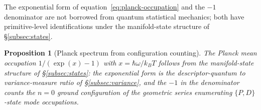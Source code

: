 \documentclass[11pt,a4paper]{article}
\newtheorem{proposition}[theorem]{Proposition}
\theoremstyle{definition}
\theoremstyle{remark}
\begin{document}
The exponential form of equation~\eqref{eq:planck-occupation} and the $-1$ denominator are not borrowed from quantum statistical mechanics; both have primitive-level identifications under the manifold-state structure of \S\ref{subsec:states}.

\begin{proposition}[Planck spectrum from configuration counting]\label{prop:planck-derived}
The Planck mean occupation $1/(\exp(x)-1)$ with $x = \hbar\omega/k_{B}T$ follows from the manifold-state structure of \S\ref{subsec:states}: the exponential form is the descriptor-quantum to variance-measure ratio of \S\ref{subsec:variance}, and the $-1$ in the denominator counts the $n=0$ ground configuration of the geometric series enumerating $\{P,D\}$-state mode occupations.
\end{proposition}
\end{document}
